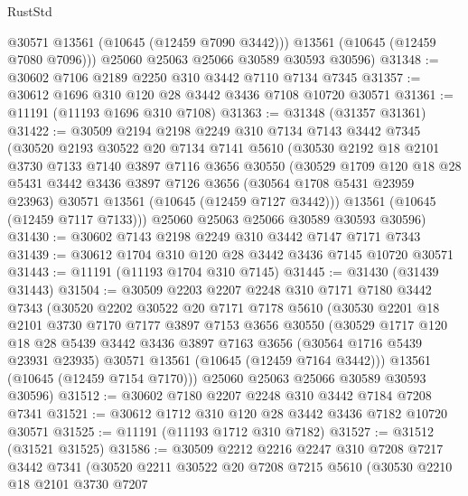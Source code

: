 \begin{lexlean}{RustStd}
\begin{coremodule}
          @30571
          @13561
          (@10645 (@12459 @7090 @3442)))
        @13561
        (@10645 (@12459 @7080 @7096)))
      @25060
      @25063
      @25066
      @30589
      @30593
      @30596)
@31348 := @30602 @7106 @2189 @2250 @310 @3442 @7110 @7134 @7345
@31357 := @30612 @1696 @310 @120 @28 @3442 @3436 @7108 @10720 @30571
@31361 := @11191 (@11193 @1696 @310 @7108)
@31363 := @31348 (@31357 @31361)
@31422 := @30509
    @2194
    @2198
    @2249
    @310
    @7134
    @7143
    @3442
    @7345
    (@30520
      @2193
      @30522
      @20
      @7134
      @7141
      @5610
      (@30530
        @2192
        @18
        @2101
        @3730
        @7133
        @7140
        @3897
        @7116
        @3656
        @30550
        (@30529
          @1709
          @120
          @18
          @28
          @5431
          @3442
          @3436
          @3897
          @7126
          @3656
          (@30564 @1708 @5431 @23959 @23963)
          @30571
          @13561
          (@10645 (@12459 @7127 @3442)))
        @13561
        (@10645 (@12459 @7117 @7133)))
      @25060
      @25063
      @25066
      @30589
      @30593
      @30596)
@31430 := @30602 @7143 @2198 @2249 @310 @3442 @7147 @7171 @7343
@31439 := @30612 @1704 @310 @120 @28 @3442 @3436 @7145 @10720 @30571
@31443 := @11191 (@11193 @1704 @310 @7145)
@31445 := @31430 (@31439 @31443)
@31504 := @30509
    @2203
    @2207
    @2248
    @310
    @7171
    @7180
    @3442
    @7343
    (@30520
      @2202
      @30522
      @20
      @7171
      @7178
      @5610
      (@30530
        @2201
        @18
        @2101
        @3730
        @7170
        @7177
        @3897
        @7153
        @3656
        @30550
        (@30529
          @1717
          @120
          @18
          @28
          @5439
          @3442
          @3436
          @3897
          @7163
          @3656
          (@30564 @1716 @5439 @23931 @23935)
          @30571
          @13561
          (@10645 (@12459 @7164 @3442)))
        @13561
        (@10645 (@12459 @7154 @7170)))
      @25060
      @25063
      @25066
      @30589
      @30593
      @30596)
@31512 := @30602 @7180 @2207 @2248 @310 @3442 @7184 @7208 @7341
@31521 := @30612 @1712 @310 @120 @28 @3442 @3436 @7182 @10720 @30571
@31525 := @11191 (@11193 @1712 @310 @7182)
@31527 := @31512 (@31521 @31525)
@31586 := @30509
    @2212
    @2216
    @2247
    @310
    @7208
    @7217
    @3442
    @7341
    (@30520
      @2211
      @30522
      @20
      @7208
      @7215
      @5610
      (@30530
        @2210
        @18
        @2101
        @3730
        @7207

\end{coremodule}
\end{lexlean}
